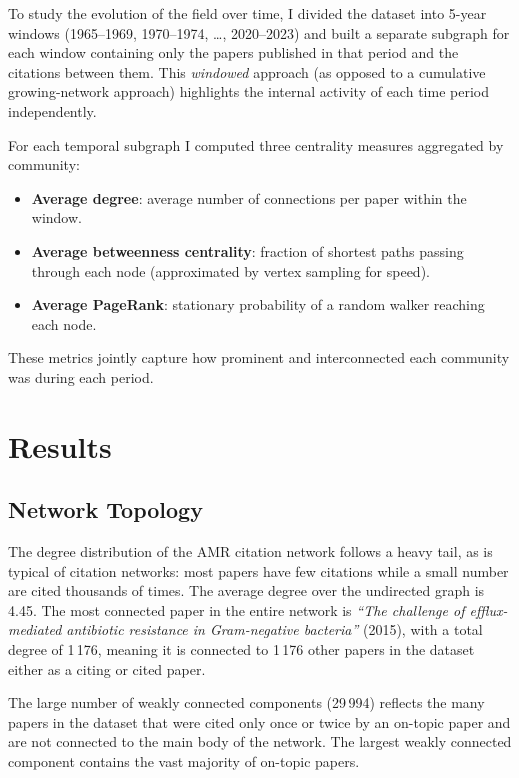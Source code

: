 \documentclass[12pt,a4paper]{article}
\begin{document}
To study the evolution of the field over time, I divided the dataset into 5-year windows
(1965--1969, 1970--1974, \ldots, 2020--2023) and built a separate subgraph for each
window containing only the papers published in that period and the citations between them.
This \textit{windowed} approach (as opposed to a cumulative growing-network approach)
highlights the internal activity of each time period independently.

For each temporal subgraph I computed three centrality measures aggregated by community:
\begin{itemize}
    \item \textbf{Average degree}: average number of connections per paper within the window.
    \item \textbf{Average betweenness centrality}: fraction of shortest paths passing
          through each node (approximated by vertex sampling for speed).
    \item \textbf{Average PageRank}: stationary probability of a random walker
          reaching each node.
\end{itemize}
These metrics jointly capture how prominent and interconnected each community was during
each period.

\section{Results}

\subsection{Network Topology}

The degree distribution of the AMR citation network follows a heavy tail, as is typical
of citation networks: most papers have few citations while a small number are cited
thousands of times.
The average degree over the undirected graph is 4.45.
The most connected paper in the entire network is
\textit{``The challenge of efflux-mediated antibiotic resistance in Gram-negative
bacteria''} (2015), with a total degree of 1\,176, meaning it is connected to 1\,176
other papers in the dataset either as a citing or cited paper.

The large number of weakly connected components (29\,994) reflects the many papers in the
dataset that were cited only once or twice by an on-topic paper and are not connected to
the main body of the network.
The largest weakly connected component contains the vast majority of on-topic papers.
\end{document}
